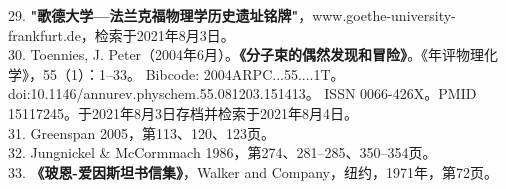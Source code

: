 29. \textbf{"歌德大学—法兰克福物理学历史遗址铭牌"}，www.goethe-university-frankfurt.de，检索于2021年8月3日。\\
30. Toennies, J. Peter（2004年6月）。\textbf{《分子束的偶然发现和冒险》}。《年评物理化学》，55（1）：1–33。
    Bibcode: 2004ARPC...55....1T。doi:10.1146/annurev.physchem.55.081203.151413。  
    ISSN 0066-426X。PMID 15117245。于2021年8月3日存档并检索于2021年8月4日。\\
31. Greenspan 2005，第113、120、123页。\\
32. Jungnickel & McCormmach 1986，第274、281–285、350–354页。\\
33. \textbf{《玻恩-爱因斯坦书信集》}，Walker and Company，纽约，1971年，第72页。\\